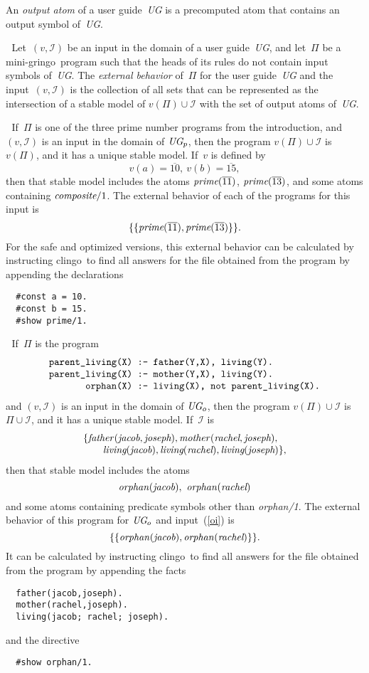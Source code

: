 \documentclass{new_tlp}
\def\beq{\begin{equation}}
\def\eeq#1{\label{#1}\end{equation}}
\def\ba{\begin{array}}
\def\ea{\end{array}}
\def\gringo{{\sc gringo}}
\def\clingo{{\sc clingo}}
\def\num{\overline}
\newcommand{\I}{\mathcal{I}}
\begin{document}
    An \emph{output atom} of a user guide~\emph{UG} is a precomputed atom
    that contains an output symbol of~\emph{UG}.
    
    \medskip{}$\;$
    Let~$(v,\I)$ be an input in the domain
    of a user guide~\emph{UG}, and let~$\Pi$ be
a mini-\gringo\ program such that the heads of its rules do not
contain input symbols of~\emph{UG}.  The \emph{external behavior} of~$\Pi$
for the user guide~\emph{UG} and the input~$(v,\I)$ is the collection
of all sets that can be represented as the intersection of a stable model
of $v(\Pi)\cup\I$ with the set of output atoms of~\emph{UG}.

\medskip{}$\;$ If~$\Pi$ is one of the
three prime number programs from the introduction, and $(v,\I)$ is an
input in the domain of $\emph{UG}_p$, then the program $v(\Pi)\cup\I$
is $v(\Pi)$, and it has a unique stable model.  If~$v$ is defined by
$$v(a)=\num{10},\ v(b)=\num{15},$$
then that stable model includes the atoms $\emph{prime}(\num{11})$,
$\emph{prime}(\num{13})$, and some atoms containing
$\emph{composite}/1$.  The external behavior of each of the programs
for this input is
$$\{\{\emph{prime}(\num{11}),\emph{prime}(\num{13})\}\}.$$
For the safe and optimized versions, this external behavior
can be calculated by instructing \clingo\ to
find all answers for the file obtained from the program by appending the
declarations
\begin{verbatim}
  #const a = 10.
  #const b = 15.
  #show prime/1.
\end{verbatim}

\medskip{}$\;$ If~$\Pi$ is the program
\beq\ba l
\verb|parent_living(X) :- father(Y,X), living(Y).|\\
\verb|parent_living(X) :- mother(Y,X), living(Y).|\\
\verb|       orphan(X) :- living(X), not parent_living(X).|
\ea\eeq{orphan1}
and $(v,\I)$ is an input in the domain of $\emph{UG}_o$, then the
program $v(\Pi)\cup\I$ is $\Pi\cup\I$, and it has a unique stable model.
If~$\I$ is
\beq\ba l
\{\emph{father\/}(\emph{jacob},\emph{joseph}),
\emph{mother\/}(\emph{rachel},\emph{joseph}),\\
\quad \quad \emph{living}(\emph{jacob}),
\emph{living}(\emph{rachel}),
\emph{living}(\emph{joseph})\},
\ea\eeq{oi}
then that stable model includes the atoms
$$\emph{orphan\/}(\emph{jacob}),\ \emph{orphan\/}(\emph{rachel})$$
and some atoms containing predicate symbols other than \emph{orphan/1}.
The external behavior of this program for $\emph{UG}_o$ and input~(\ref{oi})
is
\beq
\{\{\emph{orphan\/}(\emph{jacob}),\emph{orphan\/}(\emph{rachel})\}\}.
\eeq{ebor}
It can be calculated by instructing \clingo\ to
find all answers for the file obtained from the program by appending the
facts
\begin{verbatim}
  father(jacob,joseph).
  mother(rachel,joseph).
  living(jacob; rachel; joseph).
\end{verbatim}
and the directive
\begin{verbatim}
  #show orphan/1.
\end{verbatim}
\end{document}
